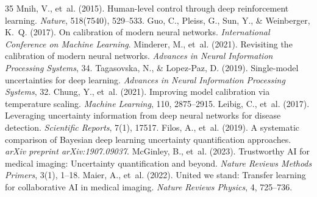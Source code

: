 \documentclass[11pt,a4paper]{article}
\begin{document}
\begin{thebibliography}{35}
 Mnih, V., et~al. (2015). Human-level control through deep reinforcement learning. \emph{Nature}, 518(7540), 529--533.
 Guo, C., Pleiss, G., Sun, Y., \& Weinberger, K.~Q. (2017). On calibration of modern neural networks. \emph{International Conference on Machine Learning}.
 Minderer, M., et~al. (2021). Revisiting the calibration of modern neural networks. \emph{Advances in Neural Information Processing Systems}, 34.
 Tagasovska, N., \& Lopez-Paz, D. (2019). Single-model uncertainties for deep learning. \emph{Advances in Neural Information Processing Systems}, 32.
 Chung, Y., et~al. (2021). Improving model calibration via temperature scaling. \emph{Machine Learning}, 110, 2875--2915.
 Leibig, C., et~al. (2017). Leveraging uncertainty information from deep neural networks for disease detection. \emph{Scientific Reports}, 7(1), 17517.
 Filos, A., et~al. (2019). A systematic comparison of Bayesian deep learning uncertainty quantification approaches. \emph{arXiv preprint arXiv:1907.09037}.
 McGinley, B., et~al. (2023). Trustworthy AI for medical imaging: Uncertainty quantification and beyond. \emph{Nature Reviews Methods Primers}, 3(1), 1--18.
 Maier, A., et~al. (2022). United we stand: Transfer learning for collaborative AI in medical imaging. \emph{Nature Reviews Physics}, 4, 725--736.
\end{thebibliography}
\end{document}
